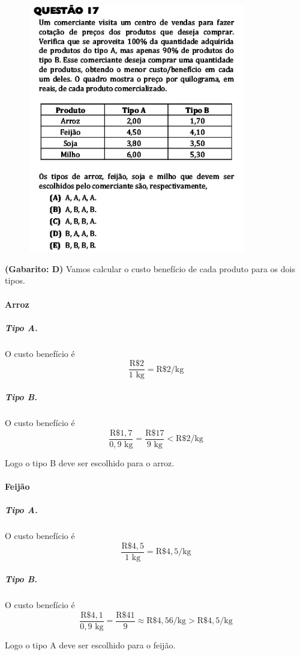 \documentclass[a4paper]{article}
\begin{document}
\begin{figure}[H]
	\begin{center}
		\includegraphics[width=9.5cm]{L3Q17.png}
	\end{center}
\end{figure}
\par\textbf{(Gabarito: D)} Vamos calcular o custo benefício de cada produto para os dois tipos.
\paragraph{Arroz}
\subparagraph{Tipo A.} O custo benefício é 
\begin{equation*}
\frac{\text{R\$}2}{1\text{ kg}} = \text{R\$}2/\text{kg}
\end{equation*}
\subparagraph{Tipo B.} O custo benefício é
\begin{equation*}
\frac{\text{R\$}1,7}{0,9\text{ kg}} = \frac{\text{R\$}17}{9\text{ kg}} < \text{R\$}2/\text{kg}
\end{equation*}
\par\vspace{0.3cm} Logo o tipo B deve ser escolhido para o arroz.
\paragraph{Feijão}
\subparagraph{Tipo A.} O custo benefício é
\begin{equation*}
\frac{\text{R\$}4,5}{1\text{ kg}} = \text{R\$}4,5/\text{kg}
\end{equation*}
\subparagraph{Tipo B.} O custo benefício é
\begin{equation*}
\frac{\text{R\$}4,1}{0,9\text{ kg}} = \frac{\text{R\$}41}{9} \approx \text{R\$}4,56/\text{kg} > \text{R\$}4,5/\text{kg} 
\end{equation*}
\par\vspace{0.3cm} Logo o tipo A deve ser escolhido para o feijão.
\end{document}
